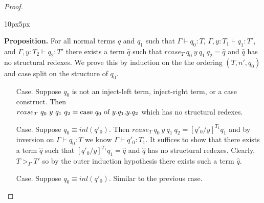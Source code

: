 \begin{proof}
\begin{changemargin}{10px}{5px}
\begin{itemize}
\begin{itemize}
    {\bf Proposition.} For all normal terms $q$ and $q_1$ such that 
    $\Gamma \vdash q_0:T$, $\Gamma, y:T_1 \vdash q_1:T'$, 
    and $\Gamma, y:T_2 \vdash q_2:T'$ there exists a term $\hat{q}$ such that 
    $rcase_{T}\ q_0\ y\ q_1\ q_2 = \hat{q}$ and $\hat{q}$ has no structural redexes.
    We prove this by induction on the the ordering $(T, n', q_0)$ and case split on the structure of $q_0$.
    \begin{itemize}
    \item[Case.] Suppose $q_0$ is not an inject-left term, inject-right term, or a case construct.  Then\\
      $rcase_{T}\ q_0\ y\ q_1\ q_2 = \mbox{case}\ q_0\ \text{of}\ y\text{.}q_1\text{,}y\text{.}q_2$ which has no structural redexes.
      
    \item[Case.] Suppose $q_0 \equiv inl(q'_0)$.  Then $rcase_{T}\ q_0\ y\ q_1\ q_2 = [q'_0/y]^{T_1} q_1$ and
      by inversion on $\Gamma \vdash q_0:T$ we know $\Gamma \vdash q'_0:T_1$.  It suffices to show that there
      exists a term $\hat{q}$ such that $[q'_0/y]^{T_1} q_1 = \hat{q}$  and $\hat{q}$ has no structural redexes.
      Clearly, $T >_{\Gamma} T'$ so by the outer induction hypothesis there exists such a term $\hat{q}$.
      
    \item[Case.] Suppose $q_0 \equiv inl(q'_0)$.  Similar to the previous case.
      

\end{itemize}
\end{itemize}
\end{itemize}
\end{changemargin}
\end{proof}
